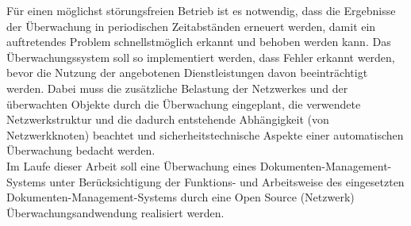 Für einen möglichst störungsfreien Betrieb ist es notwendig, dass die Ergebnisse der Überwachung in periodischen Zeitabständen erneuert werden, damit ein auftretendes Problem schnellstmöglich erkannt und behoben werden kann.
Das Überwachungssystem soll so implementiert werden, dass Fehler erkannt werden, bevor die Nutzung der angebotenen Dienstleistungen davon beeinträchtigt werden.
Dabei muss die zusätzliche Belastung der Netzwerkes und der überwachten Objekte durch die Überwachung eingeplant, die verwendete Netzwerkstruktur und die dadurch entstehende Abhängigkeit (von Netzwerkknoten) beachtet und sicherheitstechnische Aspekte einer automatischen Überwachung bedacht werden.\\


Im Laufe dieser Arbeit soll eine Überwachung eines Dokumenten-Management-Systems unter Berücksichtigung der Funktions- und Arbeitsweise des eingesetzten Dokumenten-Management-Systems durch eine Open Source (Netzwerk) Überwachungsandwendung realisiert werden.
 

